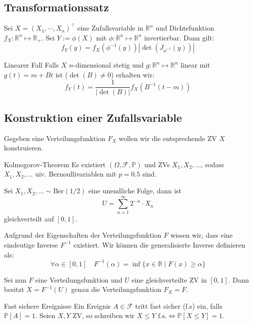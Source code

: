 \documentclass[a4paper,10pt]{article}
\def\R{\mathbb{R}}
\def\P{\mathbb{P}}
\def\F{\mathcal{F}}
\begin{document}
\subsection{Transformationssatz}

\begin{mainbox}{}
	Sei $X = (X_1, \cdots, X_n)^\top$ eine Zufallsvariable in $\R^n$ und Dichtefunktion $f_X: \R^n \mapsto \R_+$. Sei $Y := \phi(X)$ mit $\phi: \R^n \mapsto \R^n$ invertierbar. Dann gilt:
	$$f_Y(y) = f_X(\phi^{-1}(y)) \left| \det \left( J_{\phi^{-1}}(y) \right) \right|$$
\end{mainbox}

\begin{mainbox}{Linearer Fall}
	Falls $X$ $n$-dimensional stetig und $g: \R^n \mapsto \R^n$ linear mit $g(t) = m + Bt$ ist ($\det(B) \neq 0$) erhalten wir:
	$$
		f_Y(t) = \frac{1}{\left| \det \left( B \right) \right|} f_X \left( B^{-1} (t - m) \right)
	$$
\end{mainbox}

\subsection{Konstruktion einer Zufallsvariable}
Gegeben eine Verteilungsfunktion \(F_X\) wollen wir die entsprechende ZV \(X\) konstruieren.
\begin{subbox}{Kolmogorov-Theorem}
	Es existiert \((\Omega, \F,\P)\) und ZVs \( X_1, X_2, \ldots\), sodass \(X_1, X_2, \ldots\) uiv. Bernoullivariablen mit \(p = 0.5\) sind.
\end{subbox}

Sei \(X_1, X_2,\ldots \sim \text{Ber}(1/2)\) eine unendliche Folge, dann ist
\[U = \sum_{n = 1}^\infty 2^{-n}\cdot X_n\]
gleichverteilt auf \([0,1]\).

Aufgrund der Eigenschaften der Verteilungsfunktion \(F\) wissen wir, dass eine eindeutige Inverse $F^{-1}$ existiert. Wir können die generalisierte Inverse definieren als: \[\forall \alpha \in [0,1] \quad F^{-1}(\alpha) = \inf \{x \in \R \mid F(x) \geq \alpha\}\]

Sei nun \(F\) eine Verteilungsfunktion und \(U\) eine gleichverteilte ZV in \([0,1]\). Dann besitzt \(X = F^{-1}(U)\) genau die Verteilungsfunktion \(F_X = F\).

\begin{subbox}{Fast sichere Ereignisse}
	Ein Ereignis \(A \in \F\) tritt fast sicher (f.s) ein, falls \(\P[A] = 1\). Seien \(X, Y\) ZV, so schreiben wir \(X \le Y \text{ f.s.} \iff \P[X\le Y] = 1\).
\end{subbox}
\end{document}
